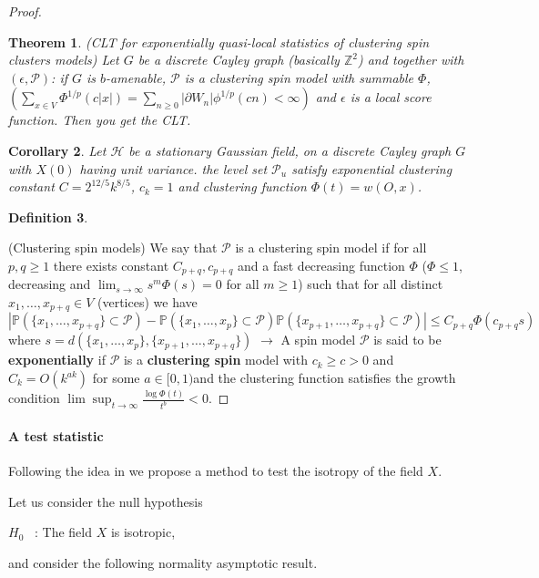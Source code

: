 \documentclass[12pt]{article}
\theoremstyle{Theorem}
\newtheorem{Theorem}{Theorem}[section]
\newtheorem{Corollary}[Theorem]{Corollary}
\newtheorem{Definition}[Theorem]{Definition}
\begin{document}
\begin{proof}
\begin{Theorem}(CLT for exponentially quasi-local statistics of clustering spin clusters models) Let $G$ be a discrete Cayley graph (basically $\mathbb{Z}^{2}$) and together with $(\epsilon, \mathcal{P})$: if $G$ is $b$-amenable, $\mathcal{P}$ is a clustering spin model with summable $\Phi$, $\left(\sum_{x \in V}\Phi^{1/p}(c|x|) = \sum_{n \geq 0} |\partial W_n| \phi^{1/p}(cn) < \infty \right)$ and $\epsilon$ is a local score function. Then you get the CLT.
\end{Theorem}
\begin{Corollary}
Let $\mathcal{H}$ be a stationary Gaussian field, on a discrete Cayley graph $G$ with $X(0)$ having unit variance. the level set $\mathcal{P}_{u}$ satisfy exponential clustering constant $C = 2^{12/5}k^{8/5}$, $c_{k} = 1$ and clustering function $\Phi(t) = w(O,x)$.
\end{Corollary}
\begin{Definition}
\end{Definition}(Clustering spin models) We say that $\mathcal{P}$ is a clustering spin model if for all $p,q \geq 1$ there exists constant $C_{p+q}, c_{p+q}$ and a fast decreasing function $\Phi$ ($\Phi \leq 1$,  decreasing and $\lim_{s \to \infty}s^{m}\Phi(s) = 0$ for all $m\geq 1$) such that for all distinct $x_{1}, \ldots, x_{p+q} \in V$ (vertices) we have 
$$|\mathbb{P}\left(\{x_{1}, \ldots, x_{p+q}\} \subset \mathcal{P}\right) - \mathbb{P}\left(\{x_{1}, \ldots, x_{p}\}\subset \mathcal{P}\right)\mathbb{P}\left(\{x_{p+1}, \ldots, x_{p+q}\}\subset \mathcal{P}\right)| \leq C_{p+q}\Phi\left(c_{p+q}s\right)$$
where $s = d\left(\{x_{1}, \ldots, x_{p}\}, \{x_{p+1}, \ldots, x_{p+q}\}\right)$
$\rightarrow$ A spin model $\mathcal{P}$ is said to be \textbf{exponentially} if $\mathcal{P}$ is a \textbf{clustering spin} model with $c_{k} \geq c > 0$ and $C_{k} = O(k^{ak})$ for some $a \in [0,1)$and the clustering function satisfies the growth condition $\lim\sup_{t\to \infty}\frac{\log\Phi(t)}{t^{b}} < 0$.
\end{proof}
\paragraph{A test statistic} Following the idea  in \cite{bierme2019}  we propose a method to test the isotropy of the field $X$.

Let us consider the null hypothesis
\begin{center}
  $H_{0}$ \, :\; The field $X$ is isotropic,
\end{center}
and consider the following normality asymptotic result.
\end{document}
